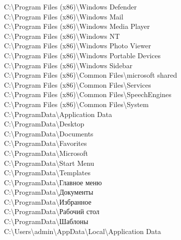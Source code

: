 C:\textbackslash Program Files (x86)\textbackslash Windows Defender \\
C:\textbackslash Program Files (x86)\textbackslash Windows Mail \\
C:\textbackslash Program Files (x86)\textbackslash Windows Media Player \\
C:\textbackslash Program Files (x86)\textbackslash Windows NT \\
C:\textbackslash Program Files (x86)\textbackslash Windows Photo Viewer \\
C:\textbackslash Program Files (x86)\textbackslash Windows Portable Devices \\
C:\textbackslash Program Files (x86)\textbackslash Windows Sidebar \\
C:\textbackslash Program Files (x86)\textbackslash Common Files\textbackslash microsoft shared \\
C:\textbackslash Program Files (x86)\textbackslash Common Files\textbackslash Services \\
C:\textbackslash Program Files (x86)\textbackslash Common Files\textbackslash SpeechEngines \\
C:\textbackslash Program Files (x86)\textbackslash Common Files\textbackslash System \\
C:\textbackslash ProgramData\textbackslash Application Data \\
C:\textbackslash ProgramData\textbackslash Desktop \\
C:\textbackslash ProgramData\textbackslash Documents \\
C:\textbackslash ProgramData\textbackslash Favorites \\
C:\textbackslash ProgramData\textbackslash Microsoft \\
C:\textbackslash ProgramData\textbackslash Start Menu \\
C:\textbackslash ProgramData\textbackslash Templates \\
C:\textbackslash ProgramData\textbackslash Главное меню \\
C:\textbackslash ProgramData\textbackslash Документы \\
C:\textbackslash ProgramData\textbackslash Избранное \\
C:\textbackslash ProgramData\textbackslash Рабочий стол \\
C:\textbackslash ProgramData\textbackslash Шаблоны \\
C:\textbackslash Users\textbackslash admin\textbackslash AppData\textbackslash Local\textbackslash Application Data \\
